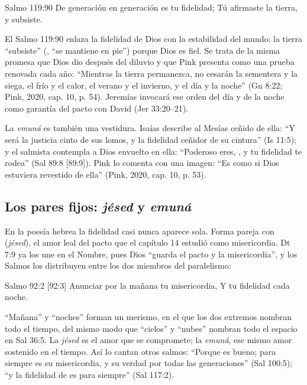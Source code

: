 \begin{verso}{Salmo 119:90}
De generación en generación es tu fidelidad; Tú afirmaste la tierra, y subsiste.
\end{verso}

El Salmo 119:90 enlaza la fidelidad de Dios con la estabilidad del mundo: la tierra ``subsiste'' (, ``se mantiene en pie'') porque Dios es fiel. Se trata de la misma promesa que Dios dio después del diluvio y que Pink presenta como una prueba renovada cada año: ``Mientras la tierra permanezca, no cesarán la sementera y la siega, el frío y el calor, el verano y el invierno, y el día y la noche'' (Gn 8:22; Pink, 2020, cap. 10, p. 54). Jeremías invocará ese orden del día y de la noche como garantía del pacto con David (Jer 33:20--21).

La \emph{emuná} es también una vestidura. Isaías describe al Mesías ceñido de ella: ``Y será la justicia cinto de sus lomos, y la fidelidad ceñidor de su cintura'' (Is 11:5); y el salmista contempla a Dios envuelto en ella: ``Poderoso eres, \SENOR, y tu fidelidad te rodea'' (Sal 89:8 [89:9]). Pink lo comenta con una imagen: ``Es como si Dios estuviera revestido de ella'' (Pink, 2020, cap. 10, p. 53).

\subsection{Los pares fijos: \emph{jésed} y \emph{emuná}}
En la poesía hebrea la fidelidad casi nunca aparece sola. Forma pareja con  (\emph{jésed}), el amor leal del pacto que el capítulo 14 estudió como misericordia. Dt 7:9 ya los une en el Nombre, pues Dios ``guarda el pacto y la misericordia'', y los Salmos los distribuyen entre los dos miembros del paralelismo:

\begin{verso}{Salmo 92:2 [92:3]}
Anunciar por la mañana tu misericordia, Y tu fidelidad cada noche.
\end{verso}

``Mañana'' y ``noches'' forman un merismo, en el que los dos extremos nombran todo el tiempo, del mismo modo que ``cielos'' y ``nubes'' nombran todo el espacio en Sal 36:5. La \emph{jésed} es el amor que se compromete; la \emph{emuná}, ese mismo amor sostenido en el tiempo. Así lo cantan otros salmos: ``Porque \SENOR{} es bueno; para siempre es su misericordia, y su verdad por todas las generaciones'' (Sal 100:5); ``y la fidelidad de \SENOR{} es para siempre'' (Sal 117:2).


